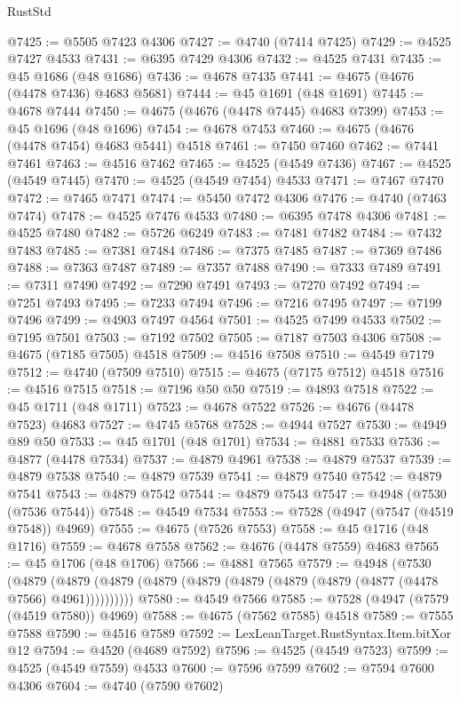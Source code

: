 \begin{lexlean}{RustStd}
\begin{coremodule}
{\begin{coremodule}
{{{{{{{{{{{{{{{{{{{{{{{{{{{{{{{{{{{{{{{{{{{{{{{{{{{{{{{{{{{{@7425 := @5505 @7423 @4306
@7427 := @4740 (@7414 @7425)
@7429 := @4525 @7427 @4533
@7431 := @6395 @7429 @4306
@7432 := @4525 @7431
@7435 := @45 @1686 (@48 @1686)
@7436 := @4678 @7435
@7441 := @4675 (@4676 (@4478 @7436) @4683 @5681)
@7444 := @45 @1691 (@48 @1691)
@7445 := @4678 @7444
@7450 := @4675 (@4676 (@4478 @7445) @4683 @7399)
@7453 := @45 @1696 (@48 @1696)
@7454 := @4678 @7453
@7460 := @4675 (@4676 (@4478 @7454) @4683 @5441) @4518
@7461 := @7450 @7460
@7462 := @7441 @7461
@7463 := @4516 @7462
@7465 := @4525 (@4549 @7436)
@7467 := @4525 (@4549 @7445)
@7470 := @4525 (@4549 @7454) @4533
@7471 := @7467 @7470
@7472 := @7465 @7471
@7474 := @5450 @7472 @4306
@7476 := @4740 (@7463 @7474)
@7478 := @4525 @7476 @4533
@7480 := @6395 @7478 @4306
@7481 := @4525 @7480
@7482 := @5726 @6249
@7483 := @7481 @7482
@7484 := @7432 @7483
@7485 := @7381 @7484
@7486 := @7375 @7485
@7487 := @7369 @7486
@7488 := @7363 @7487
@7489 := @7357 @7488
@7490 := @7333 @7489
@7491 := @7311 @7490
@7492 := @7290 @7491
@7493 := @7270 @7492
@7494 := @7251 @7493
@7495 := @7233 @7494
@7496 := @7216 @7495
@7497 := @7199 @7496
@7499 := @4903 @7497 @4564
@7501 := @4525 @7499 @4533
@7502 := @7195 @7501
@7503 := @7192 @7502
@7505 := @7187 @7503 @4306
@7508 := @4675 (@7185 @7505) @4518
@7509 := @4516 @7508
@7510 := @4549 @7179
@7512 := @4740 (@7509 @7510)
@7515 := @4675 (@7175 @7512) @4518
@7516 := @4516 @7515
@7518 := @7196 @50 @50
@7519 := @4893 @7518
@7522 := @45 @1711 (@48 @1711)
@7523 := @4678 @7522
@7526 := @4676 (@4478 @7523) @4683
@7527 := @4745 @5768
@7528 := @4944 @7527
@7530 := @4949 @89 @50
@7533 := @45 @1701 (@48 @1701)
@7534 := @4881 @7533
@7536 := @4877 (@4478 @7534)
@7537 := @4879 @4961
@7538 := @4879 @7537
@7539 := @4879 @7538
@7540 := @4879 @7539
@7541 := @4879 @7540
@7542 := @4879 @7541
@7543 := @4879 @7542
@7544 := @4879 @7543
@7547 := @4948 (@7530 (@7536 @7544))
@7548 := @4549 @7534
@7553 := @7528 (@4947 (@7547 (@4519 @7548)) @4969)
@7555 := @4675 (@7526 @7553)
@7558 := @45 @1716 (@48 @1716)
@7559 := @4678 @7558
@7562 := @4676 (@4478 @7559) @4683
@7565 := @45 @1706 (@48 @1706)
@7566 := @4881 @7565
@7579 := @4948
    (@7530
      (@4879 (@4879 (@4879 (@4879 (@4879 (@4879 (@4879 (@4879 (@4877 (@4478 @7566) @4961))))))))))
@7580 := @4549 @7566
@7585 := @7528 (@4947 (@7579 (@4519 @7580)) @4969)
@7588 := @4675 (@7562 @7585) @4518
@7589 := @7555 @7588
@7590 := @4516 @7589
@7592 := LexLeanTarget.RustSyntax.Item.bitXor @12
@7594 := @4520 (@4689 @7592)
@7596 := @4525 (@4549 @7523)
@7599 := @4525 (@4549 @7559) @4533
@7600 := @7596 @7599
@7602 := @7594 @7600 @4306
@7604 := @4740 (@7590 @7602)
}}}}}}}}}}}}}}}}}}}}}}}}}}}}}}}}}}}}}}}}}}}}}}}}}}}}}}}}}}}}
\end{coremodule}}
\end{coremodule}
\end{lexlean}

